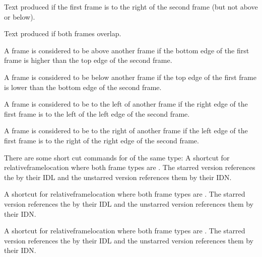 \documentclass[fontsize=12pt]{scrbook}
\begin{document}
Text produced if the first frame is to the right of the
second frame (but not above or below).

Text produced if both frames overlap.

\begin{deflist}

\begin{itemdesc}
A frame is considered to be above another frame if the bottom edge
of the first frame is higher than the top edge of the second frame. 
\end{itemdesc}


\begin{itemdesc}
A frame is considered to be below another frame if the top edge
of the first frame is lower than the bottom edge of the second frame.
\end{itemdesc}


\begin{itemdesc}
A frame is considered to be to the left of another frame if the right 
edge of the first frame is to the left of the left edge of the second
frame.
\end{itemdesc}


\begin{itemdesc}
A frame is considered to be to the right of another frame if the left
edge of the first frame is to the right of the right edge of the
second frame.
\end{itemdesc}
\end{deflist}

There are some short cut commands for  of the
same type:
A shortcut for \gls{relativeframelocation} where both frame
types are . The starred version references the
 by their \gls{IDL} and the unstarred version
references them by their \gls{IDN}.

A shortcut for \gls{relativeframelocation} where both frame
types are . The starred version references the
 by their \gls{IDL} and the unstarred version
references them by their \gls{IDN}.

A shortcut for \gls{relativeframelocation} where both frame
types are . The starred version references the
 by their \gls{IDL} and the unstarred version
references them by their \gls{IDN}.
\end{document}
